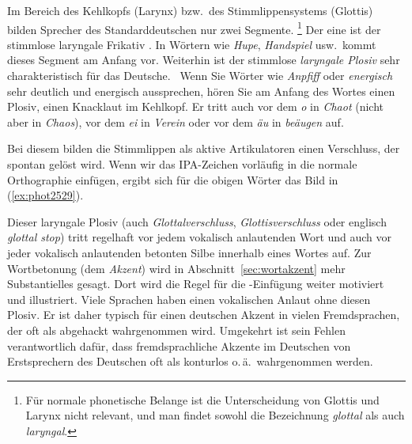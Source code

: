 
Im Bereich des Kehlkopfs (Larynx) bzw.\ des Stimmlippensystems (Glottis) bilden Sprecher des Standarddeutschen nur zwei Segmente.%
\footnote{Für normale phonetische Belange ist die Unterscheidung von Glottis und Larynx nicht relevant, und man findet sowohl die Bezeichnung \textit{glottal} als auch \textit{laryngal}.}
Der eine ist der stimmlose laryngale Frikativ \textipa{[h]}.
In Wörtern wie \textit{Hupe}, \textit{Handspiel} usw.\ kommt dieses Segment am Anfang vor.
Weiterhin ist der stimmlose \textit{laryngale Plosiv} \textipa{[P]} sehr charakteristisch für das Deutsche.
\TuBegin~Wenn Sie Wörter wie \textit{Anpfiff} oder \textit{energisch} sehr deutlich und energisch aussprechen, hören Sie am Anfang des Wortes einen Plosiv, einen Knacklaut im Kehlkopf.
Er tritt auch vor dem \textit{o} in \textit{Chaot} (nicht aber in \textit{Chaos}), vor dem \textit{ei} in \textit{Verein} oder vor dem \textit{äu} in \textit{beäugen} auf.

Bei diesem bilden die Stimmlippen als aktive Artikulatoren einen Verschluss, der spontan gelöst wird.
Wenn wir das IPA-Zeichen  vorläufig in die normale Orthographie einfügen, ergibt sich für die obigen Wörter das Bild in (\ref{ex:phot2529}).

\begin{exe}
  \ex\label{ex:phot2529}
  \begin{xlist}
  \end{xlist}
\end{exe}

Dieser laryngale Plosiv (auch \textit{Glottalverschluss}, \textit{Glottisverschluss} oder englisch \textit{glottal stop}) tritt regelhaft vor jedem vokalisch anlautenden Wort und auch vor jeder vokalisch anlautenden betonten Silbe innerhalb eines Wortes auf.
Zur Wortbetonung (dem \textit{Akzent}) wird in Abschnitt~\ref{sec:wortakzent} mehr Substantielles gesagt.
Dort wird die Regel für die \textipa{[P]}-Einfügung weiter motiviert und illustriert.
Viele Sprachen haben einen vokalischen Anlaut ohne diesen Plosiv.
Er ist daher typisch für einen deutschen Akzent in vielen Fremdsprachen, der oft als abgehackt wahrgenommen wird.
Umgekehrt ist sein Fehlen verantwortlich dafür, dass fremdsprachliche Akzente im Deutschen von Erstsprechern des Deutschen oft als konturlos o.\,ä.\ wahrgenommen werden.

